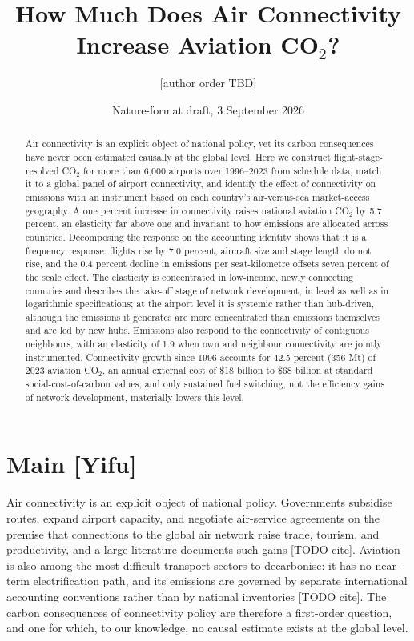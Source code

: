 \documentclass[12pt]{article}
\title{How Much Does Air Connectivity Increase Aviation CO$_2$?}
\author{[author order TBD]}
\date{Nature-format draft, 3 September 2026}
\begin{document}
\maketitle

\begin{abstract}
\noindent Air connectivity is an explicit object of national policy, yet its
carbon consequences have never been estimated causally at the global level.
Here we construct flight-stage-resolved CO$_2$ for more than 6{,}000
airports over 1996--2023 from schedule data, match it to a global panel of
airport connectivity, and identify the effect of connectivity on emissions
with an instrument based on each country's air-versus-sea market-access
geography. A one percent increase in connectivity raises national aviation
CO$_2$ by 5.7 percent, an elasticity far above one and invariant to how
emissions are allocated across countries. Decomposing the response on the
accounting identity shows that it is a frequency response: flights rise by
7.0 percent, aircraft size and stage length do not rise, and the 0.4 percent
decline in emissions per seat-kilometre offsets seven percent of the scale
effect. The elasticity is concentrated in low-income, newly connecting
countries and describes the take-off stage of network development, in
level as well as in logarithmic specifications; at the airport level it is systemic rather than hub-driven,
although the emissions it generates are more concentrated than emissions
themselves and are led by new hubs. Emissions also respond to the
connectivity of contiguous neighbours, with an elasticity of 1.9 when own and
neighbour connectivity are jointly instrumented. Connectivity growth since
1996 accounts for 42.5 percent (356 Mt) of 2023 aviation CO$_2$, an annual
external cost of \$18 billion to \$68 billion at standard social-cost-of-carbon
values, and only sustained fuel switching, not the efficiency gains of
network development, materially lowers this level.
\end{abstract}

\section*{Main [Yifu]}
Air connectivity is an explicit object of national policy. Governments
subsidise routes, expand airport capacity, and negotiate air-service
agreements on the premise that connections to the global air network raise
trade, tourism, and productivity, and a large literature documents such
gains [TODO cite]. Aviation is also among the most difficult transport
sectors to decarbonise: it has no near-term electrification path, and its
emissions are governed by separate international accounting conventions
rather than by national inventories [TODO cite]. The carbon consequences of
connectivity policy are therefore a first-order question, and one for
which, to our knowledge, no causal estimate exists at the global level.
\end{document}

